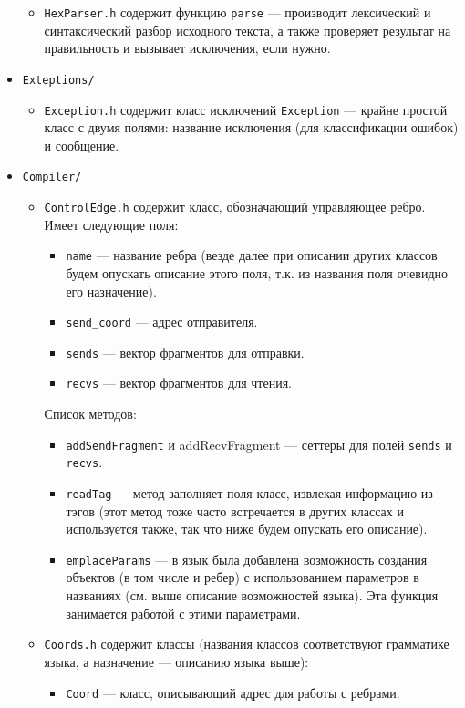 \documentclass[a4paper, 12pt]{article}
\newcommand{\cd}[1]{\lstinline$#1$}
\begin{document}
\begin{itemize}
\begin{itemize}
			\item \cd{HexParser.h}  содержит функцию \cd{parse} --- производит лексический и синтаксический разбор исходного текста, а также проверяет результат на правильность и вызывает исключения, если нужно.
		\end{itemize}
		\item \cd{Exteptions/}
		\begin{itemize}
			\item \cd{Exception.h} содержит класс исключений \cd{Exception} --- крайне простой класс с двумя полями: название исключения (для классификации ошибок) и сообщение.
		\end{itemize}
		\item \cd{Compiler/}
		\begin{itemize}
			\item \cd{ControlEdge.h} содержит класс, обозначающий управляющее ребро. Имеет следующие поля:
			\begin{itemize}
				\item \cd{name} --- название ребра (везде далее при описании других классов будем опускать описание этого поля, т.к. из названия поля очевидно его назначение).
				\item \cd{send_coord} --- адрес отправителя.
				\item \cd{sends} --- вектор фрагментов для отправки.
				\item \cd{recvs} --- вектор фрагментов для чтения.
			\end{itemize}
			Список методов:
			\begin{itemize}
				\item \cd{addSendFragment} и {addRecvFragment} --- сеттеры для полей \cd{sends} и \cd{recvs}.
				\item \cd{readTag} --- метод заполняет поля класс, извлекая информацию из тэгов (этот метод тоже часто встречается в других классах и используется также,  так что ниже будем опускать его описание).
				\item \cd{emplaceParams} --- в язык была добавлена возможность создания объектов (в том числе и ребер) с использованием параметров в названиях (см. выше описание возможностей языка). Эта функция занимается работой с этими параметрами.
			\end{itemize}
			\item \cd{Coords.h} содержит классы (названия классов соответствуют грамматике языка, а назначение --- описанию языка выше):
			\begin{itemize}
				\item \cd{Coord} --- класс, описывающий адрес для работы с ребрами.

\end{itemize}
\end{itemize}
\end{itemize}
\end{document}
